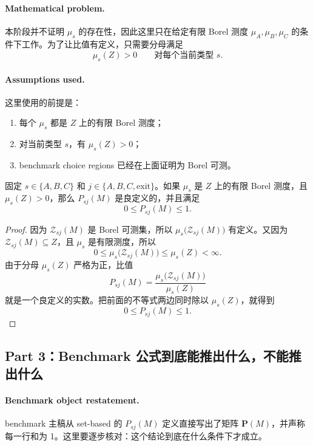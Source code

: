 \paragraph{Mathematical problem.}
本阶段并不证明 $\mu_s$ 的存在性，因此这里只在给定有限 Borel 测度 $\mu_A,\mu_B,\mu_C$ 的条件下工作。为了让比值有定义，只需要分母满足
\[
\mu_s(Z)>0\qquad\text{对每个当前类型 }s.
\]

\paragraph{Assumptions used.}
这里使用的前提是：
\begin{enumerate}
    \item 每个 $\mu_s$ 都是 $Z$ 上的有限 Borel 测度；
    \item 对当前类型 $s$，有 $\mu_s(Z)>0$；
    \item benchmark choice regions 已经在上面证明为 Borel 可测。
\end{enumerate}

\begin{proposition}
固定 $s\in\{A,B,C\}$ 和 $j\in\{A,B,C,\mathrm{exit}\}$。如果 $\mu_s$ 是 $Z$ 上的有限 Borel 测度，且 $\mu_s(Z)>0$，那么 $P_{sj}(M)$ 是良定义的，并且满足
\[
0\le P_{sj}(M)\le 1.
\]
\end{proposition}

\begin{proof}
因为 $\mathcal Z_{sj}(M)$ 是 Borel 可测集，所以 $\mu_s\bigl(\mathcal Z_{sj}(M)\bigr)$ 有定义。又因为 $\mathcal Z_{sj}(M)\subseteq Z$，且 $\mu_s$ 是有限测度，所以
\[
0\le \mu_s\bigl(\mathcal Z_{sj}(M)\bigr)\le \mu_s(Z)<\infty.
\]
由于分母 $\mu_s(Z)$ 严格为正，比值
\[
P_{sj}(M)=\frac{\mu_s\bigl(\mathcal Z_{sj}(M)\bigr)}{\mu_s(Z)}
\]
就是一个良定义的实数。把前面的不等式两边同时除以 $\mu_s(Z)$，就得到
\[
0\le P_{sj}(M)\le 1.
\]
\end{proof}

\subsection{Part 3：Benchmark 公式到底能推出什么，不能推出什么}

\paragraph{Benchmark object restatement.}
benchmark 主稿从 set-based 的 $P_{sj}(M)$ 定义直接写出了矩阵 $\mathbf P(M)$，并声称每一行和为 1。这里要逐步核对：这个结论到底在什么条件下才成立。

